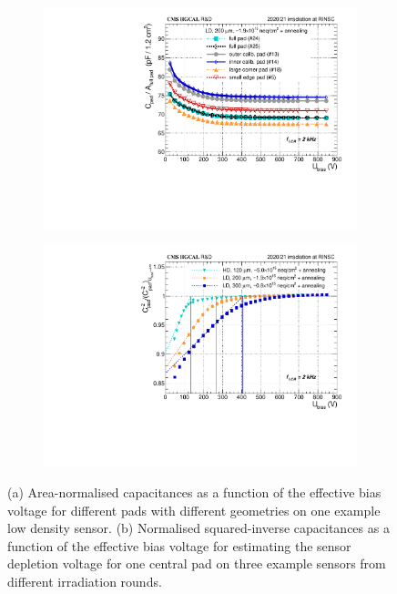 \begin{figure}
	\captionsetup[subfigure]{aboveskip=-1pt,belowskip=-1pt}
	\centering
	\begin{subfigure}[b]{0.49\textwidth}
		\includegraphics[width=0.999\textwidth]{plots/channel_cv/channel_CV_sensors_channels.pdf}
		\subcaption{
		}
		\label{plot:pad_CV_channels}
	\end{subfigure}
	\hfill
	\begin{subfigure}[b]{0.49\textwidth}
		\includegraphics[width=0.999\textwidth]{plots/channel_cv/channel_invCV_sensors_sensors.pdf}
		\subcaption{
		}
		\label{plot:pad_invCV_sensor}
	\end{subfigure}
	\caption{
		(a) Area-normalised capacitances as a function of the effective bias voltage for different pads with different geometries on one example low density sensor.
		(b) Normalised squared-inverse capacitances as a function of the effective bias voltage for estimating the sensor depletion voltage for one central pad on three example sensors from different irradiation rounds.
	}
\end{figure}
